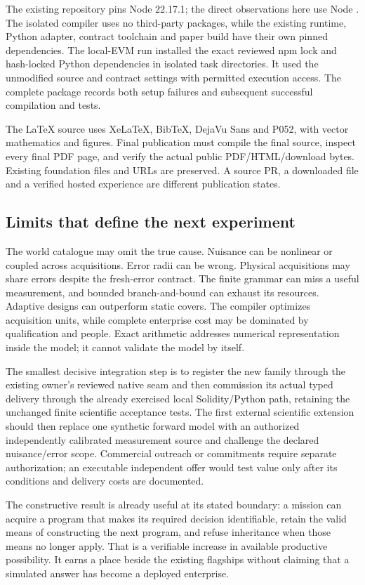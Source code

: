 \documentclass[11pt,letterpaper]{article}
\theoremstyle{definition}\newtheorem{definition}[theorem]{Definition}
\theoremstyle{remark}\newtheorem{remark}[theorem]{Remark}
\begin{document}
The existing repository pins Node 22.17.1; the direct observations here use Node \ObservedNodeVersion. The isolated compiler uses no third-party packages, while the existing runtime, Python adapter, contract toolchain and paper build have their own pinned dependencies. The local-EVM run installed the exact reviewed npm lock and hash-locked Python dependencies in isolated task directories. It used the unmodified source and contract settings with permitted execution access. The complete package records both setup failures and subsequent successful compilation and tests.

The LaTeX source uses XeLaTeX, BibTeX, DejaVu Sans and P052, with vector mathematics and figures. Final publication must compile the final source, inspect every final PDF page, and verify the actual public PDF/HTML/download bytes. \PublicationQAStatus{} Existing foundation files and URLs are preserved. A source PR, a downloaded file and a verified hosted experience are different publication states.

\subsection{Limits that define the next experiment}
The world catalogue may omit the true cause. Nuisance can be nonlinear or coupled across acquisitions. Error radii can be wrong. Physical acquisitions may share errors despite the fresh-error contract. The finite grammar can miss a useful measurement, and bounded branch-and-bound can exhaust its resources. Adaptive designs can outperform static covers. The compiler optimizes acquisition units, while complete enterprise cost may be dominated by qualification and people. Exact arithmetic addresses numerical representation inside the model; it cannot validate the model by itself.

The smallest decisive integration step is to register the new family through the existing owner's reviewed native seam and then commission its actual typed delivery through the already exercised local Solidity/Python path, retaining the unchanged finite scientific acceptance tests. The first external scientific extension should then replace one synthetic forward model with an authorized independently calibrated measurement source and challenge the declared nuisance/error scope. Commercial outreach or commitments require separate authorization; an executable independent offer would test value only after its conditions and delivery costs are documented.

The constructive result is already useful at its stated boundary: a mission can acquire a program that makes its required decision identifiable, retain the valid means of constructing the next program, and refuse inheritance when those means no longer apply. That is a verifiable increase in available productive possibility. It earns a place beside the existing flagships without claiming that a simulated answer has become a deployed enterprise.
\end{document}
